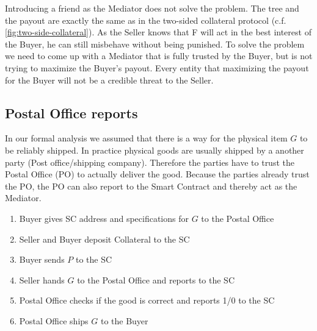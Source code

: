 \documentclass{cacthesis}
\begin{document}
Introducing a friend as the Mediator does not solve the problem. The tree and
the payout are exactly the same as in the two-sided collateral protocol (c.f. \ref{fig:two-side-collateral}). As the Seller knows that F will act in the best interest of the Buyer, he can still misbehave without being punished.
To solve the problem we need to come up with a Mediator that is fully trusted by
the Buyer, but is not trying to maximize the Buyer's payout.
Every entity that maximizing the payout for the Buyer will not be a
credible threat to the Seller.


\subsection{Postal Office reports}
In our formal analysis we assumed that there is a way for the physical item $G$ to be reliably shipped. In practice physical goods are usually shipped by a another party (Post office/shipping company).
Therefore the parties have to trust the Postal Office (PO) to actually deliver the good. Because the parties already trust the PO, the PO can also report to the Smart Contract and thereby act as the Mediator.
\begin{enumerate}
    \item Buyer gives SC address and specifications for $G$ to the Postal Office
    \item Seller and Buyer deposit Collateral to the SC
    \item Buyer sends $P$ to the SC
    \item Seller hands $G$ to the Postal Office and reports to the SC
    \item Postal Office checks if the good is correct and reports 1/0 to the SC
    \item Postal Office ships $G$ to the Buyer
\end{enumerate}
\end{document}
